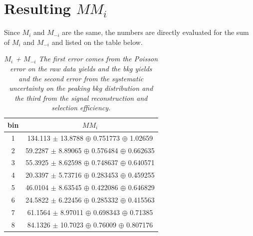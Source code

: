 \section{Resulting $MM_i$}
Since $M_i$	and $M_{-i}$ are the same, the numbers are directly evaluated for the sum of $M_i$ and $M_{-i}$ and listed on the table below.
\begin{table}[!h]
	\begin{center}
		\begin{tabular}{c| c }
			bin & $MM_i$  \\
			\hline
1 & 134.113 $\pm$ 13.8788 $\oplus$ 0.751773 $\oplus$ 1.02659 \\ 
2 & 59.2287 $\pm$ 8.89065 $\oplus$ 0.576484 $\oplus$ 0.662635 \\ 
3 & 55.3925 $\pm$ 8.62598 $\oplus$ 0.748637 $\oplus$ 0.640571 \\ 
4 & 20.3397 $\pm$ 5.73716 $\oplus$ 0.283453 $\oplus$ 0.459255 \\ 
5 & 46.0104 $\pm$ 8.63545 $\oplus$ 0.422086 $\oplus$ 0.646829 \\ 
6 & 24.5822 $\pm$ 6.22456 $\oplus$ 0.285332 $\oplus$ 0.415563 \\ 
7 & 61.1564 $\pm$ 8.97011 $\oplus$ 0.698343 $\oplus$ 0.71385 \\ 
8 & 84.1326 $\pm$ 10.7023 $\oplus$ 0.76009 $\oplus$ 0.807176 \\ 
	\end{tabular}
\end{center}
\caption{\textit{$M_i$ + $M_{-i}$ The first error comes from the Poisson error on the raw data yields and the bkg yields and the second error from the systematic uncertainty on the peaking bkg distribution and the third from the signal reconstruction and selection efficiency.}}
\label{tab:MMKl}
\end{table} 

